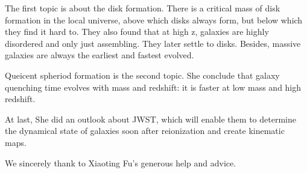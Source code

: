 \documentclass[modern]{aastex63}
\begin{document}
The first topic is about the disk formation. There is a critical mass of disk formation in the local universe, above which disks always form, but below which they find it hard to. They also found that at high z, galaxies are highly disordered and only just assembling. They later settle to disks. Besides, massive galaxies are always the earliest and fastest evolved.

Queicent spheriod formation is the second topic. She conclude that galaxy quenching time evolves with mass and redshift: it is faster at low mass and high redshift.

At last, She did an outlook about JWST, which will enable them to determine the dynamical state of galaxies soon after reionization and create kinematic maps.


\acknowledgments
We sincerely thank to Xiaoting Fu's generous help and advice. 

\newpage
{}

\end{document}
